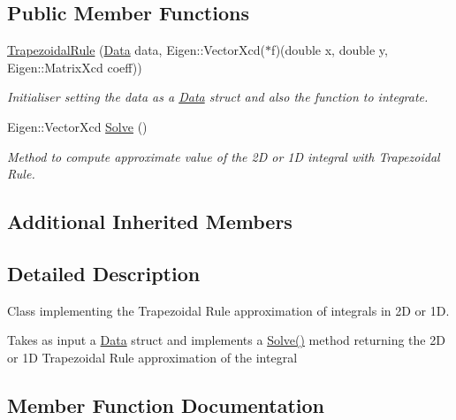 \subsection*{Public Member Functions}
\begin{DoxyCompactItemize}
\item 
\mbox{\label{class_trapezoidal_rule_ac366b3b5a8758ad00590f029c0b0bdd7}} 
\hyperlink{class_trapezoidal_rule_ac366b3b5a8758ad00590f029c0b0bdd7}{Trapezoidal\+Rule} (\hyperlink{struct_data}{Data} data, Eigen\+::\+Vector\+Xcd($\ast$f)(double x, double y, Eigen\+::\+Matrix\+Xcd coeff))
\begin{DoxyCompactList}\small\item\em Initialiser setting the data as a \hyperlink{struct_data}{Data} struct and also the function to integrate. \end{DoxyCompactList}\item 
Eigen\+::\+Vector\+Xcd \hyperlink{class_trapezoidal_rule_ae822d86948bdc8876bf524cd620e11b8}{Solve} ()
\begin{DoxyCompactList}\small\item\em Method to compute approximate value of the 2D or 1D integral with Trapezoidal Rule. \end{DoxyCompactList}\end{DoxyCompactItemize}
\subsection*{Additional Inherited Members}


\subsection{Detailed Description}
Class implementing the Trapezoidal Rule approximation of integrals in 2D or 1D. 

Takes as input a \hyperlink{struct_data}{Data} struct and implements a \hyperlink{class_trapezoidal_rule_ae822d86948bdc8876bf524cd620e11b8}{Solve()} method returning the 2D or 1D Trapezoidal Rule approximation of the integral 

\subsection{Member Function Documentation}
\mbox{\label{class_trapezoidal_rule_ae822d86948bdc8876bf524cd620e11b8}} 
